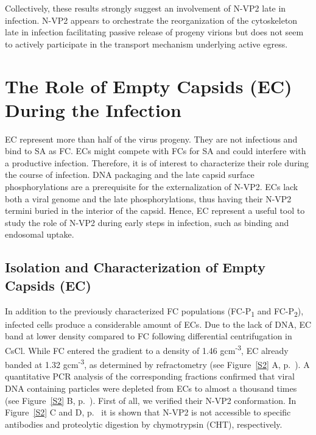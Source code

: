 Collectively, these results strongly suggest an involvement of N-VP2 late in infection. N-VP2 appears to orchestrate the reorganization of the cytoskeleton late in infection facilitating passive release of progeny virions but does not seem to actively participate in the transport mechanism underlying active egress.        

\clearpage

\section{The Role of Empty Capsids (EC) During the Infection}

EC represent more than half of the virus progeny. They are not infectious and bind to SA as FC. ECs might compete with FCs for SA and could interfere with a productive infection. Therefore, it is of interest to characterize their role during the course of infection. DNA packaging and the late capsid surface phosphorylations are a prerequisite for the externalization of N-VP2. ECs lack both a viral genome and the late phosphorylations, thus having their N-VP2 termini buried in the interior of the capsid. Hence, EC represent a useful tool to study the role of N-VP2 during early steps in infection, such as binding and endosomal uptake.   

\subsection{Isolation and Characterization of Empty Capsids (EC)}

In addition to the previously characterized FC populations (FC-P\textsubscript{1} and FC-P\textsubscript{2}), infected cells produce a considerable amount of ECs. Due to the lack of DNA, EC band at lower density compared to FC following differential centrifugation in CsCl. While FC entered the gradient to a density of 1.46 gcm\textsuperscript{-3}, EC already banded at 1.32 gcm\textsuperscript{-3}, as determined by refractometry (see Figure~\ref{S2} A, p.~\pageref{S2}). A quantitative PCR analysis of the corresponding fractions confirmed that viral DNA containing particles were depleted from ECs to almost a thousand times (see Figure~\ref{S2} B, p.~\pageref{S2}). First of all, we verified their N-VP2 conformation. In Figure~\ref{S2} C and D, p.~\pageref{S2} it is shown that N-VP2 is not accessible to specific antibodies and proteolytic digestion by chymotrypsin (CHT), respectively. 

